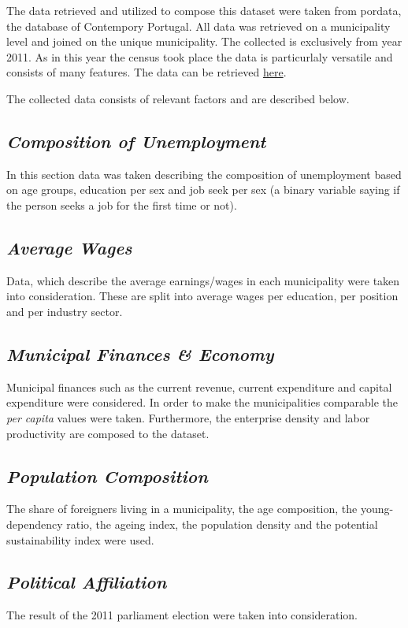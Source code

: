 \documentclass[12pt]{article}
\begin{document}
{The data retrieved and utilized to compose this dataset were taken from pordata, the database of Contempory Portugal. All data was retrieved on a municipality level and joined on the unique municipality. The collected is exclusively from year 2011. As in this year the census took place the data is particurlaly versatile and consists of many features. The data can be retrieved \href{https://drive.google.com/open?id=1oQgpETAuAHQqdlWaiQMgGuqTx9VxdCZY}{here}.

The collected data consists of relevant factors and are described below.

\subsection*{\textit{Composition of Unemployment}}
In this section data was taken describing the composition of unemployment based on age groups, education per sex and job seek per sex (a binary variable saying if the person seeks a job for the first time or not).

\subsection*{\textit{Average Wages}}
Data, which describe the average earnings/wages in each municipality were taken into consideration. These are split into average wages per education, per position and per industry sector.

\subsection*{\textit{Municipal Finances \& Economy}}
Municipal finances such as the current revenue, current expenditure and capital expenditure were considered. In order to make the municipalities comparable the \textit{per capita} values were taken. Furthermore, the enterprise density and labor productivity are composed to the dataset.

\subsection*{\textit{Population Composition}}
The share of foreigners living in a municipality, the age composition, the young-dependency ratio, the ageing index, the population density and the potential sustainability index were used.


\subsection*{\textit{Political Affiliation}}
The result of the 2011 parliament election were taken into consideration.

}
\end{document}
